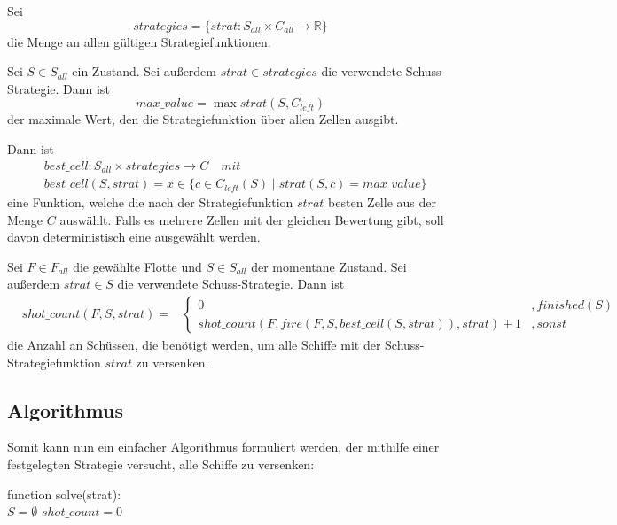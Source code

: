 \documentclass[a4paper,12pt]{llncs}
\numberwithin{equation}{section}
\begin{document}
\begin{definition}
Sei
\[
strategies=\{ strat:S_{all} \times C_{all} \rightarrow \mathbb{R} \}
\]
die Menge an allen gültigen Strategiefunktionen.
\end{definition}

\begin{definition}
Sei $S\in S_{all}$ ein Zustand.
Sei außerdem $strat \in strategies$ die verwendete Schuss-Strategie.
Dann ist
\[
max\_value=\max strat(S, C_{left})
\]
der maximale Wert, den die Strategiefunktion über allen Zellen ausgibt.

Dann ist
\begin{align}
&best\_cell:S_{all} \times strategies \rightarrow C \quad mit \nonumber\\
&best\_cell(S, strat)=x \in \{c \in C_{left}(S) \mid strat(S, c) = max\_value\}
\nonumber
\end{align}
eine Funktion, welche die nach der Strategiefunktion $strat$ besten Zelle aus der Menge $C$ auswählt.
Falls es mehrere Zellen mit der gleichen Bewertung gibt, soll davon deterministisch eine ausgewählt werden.
\end{definition}

\begin{definition}
Sei $F\in F_{all}$ die gewählte Flotte und $S\in S_{all}$ der momentane Zustand.
Sei außerdem $strat \in S$ die verwendete Schuss-Strategie.
Dann ist
\begin{align}
&shot\_count(F, S, strat)=
& \begin{cases} 
  	0& ,finished(S) \\
      shot\_count(F, fire(F, S, best\_cell(S, strat)), strat) + 1 & ,sonst
   \end{cases}
\nonumber
\end{align}
die Anzahl an Schüssen, die benötigt werden, um alle Schiffe mit der Schuss-Strategiefunktion $strat$ zu versenken.
\end{definition}

\subsection{Algorithmus}

Somit kann nun ein einfacher Algorithmus formuliert werden, der mithilfe einer festgelegten Strategie versucht, alle Schiffe zu versenken:

\begin{algorithm}[H]
 function solve(strat):\\
 $S=\emptyset$\;
 $shot\_count=0$\;
\end{algorithm}
\end{document}
